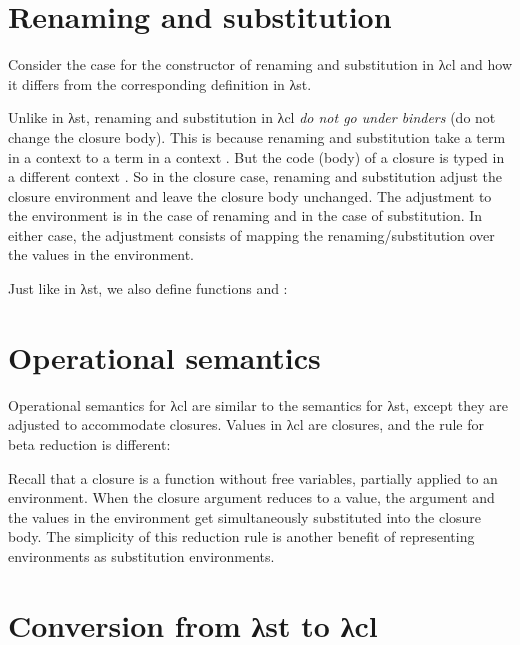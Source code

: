 \documentclass[bsc,frontabs,oneside,singlespacing,parskip,deptreport]{infthesis}
\theoremstyle{definition}
\theoremstyle{lemma}
\begin{document}
\section{Renaming and substitution}
\label{sec:renam-subst}

Consider the case for the constructor  of renaming and
substitution in λcl and how it differs from the corresponding
definition in λst.


Unlike in λst, renaming and substitution in λcl \textit{do not go
  under binders} (do not change the closure body). This is because
renaming and substitution take a term in a context  to a term in
a context . But the code (body) of a closure is typed in a
different context . So in the closure case, renaming and
substitution adjust the closure environment and leave the closure body
unchanged. The adjustment to the environment is 
in the case of renaming and  in the case of
substitution. In either case, the adjustment consists of mapping the
renaming/substitution over the values in the environment.

Just like in λst, we also define functions  and :


\section{Operational semantics}
\label{sec:oper-semant}

Operational semantics for λcl are similar to the semantics for λst,
except they are adjusted to accommodate closures. Values in λcl are
closures, and the rule for beta reduction is different:


Recall that a closure is a function without free variables,
partially applied to an environment. When the closure argument reduces
to a value, the argument and the values in the environment get
simultaneously substituted into the closure body. The simplicity of
this reduction rule is another benefit of representing environments as
substitution environments.

\section{Conversion from λst to λcl}
\label{sec:conversion-from-st}
\end{document}
